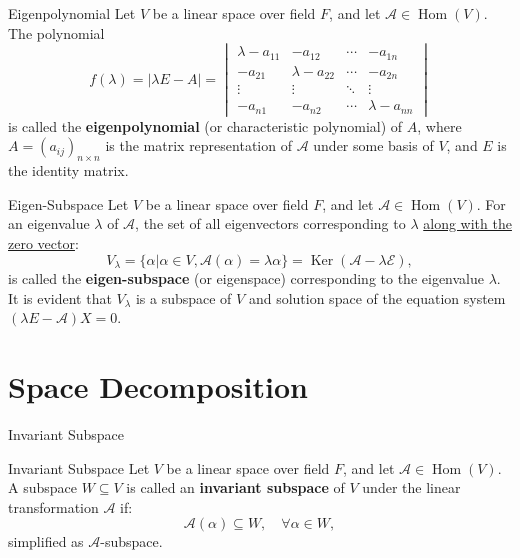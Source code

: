 \documentclass[11pt]{../../TexTemplate/elegantbook} %
\begin{document}
\begin{definition}{Eigenpolynomial}
    Let \( V \) be a linear space over field \( F \), 
    and let \( \mathcal{A}\in \operatorname{Hom}(V) \).
    The polynomial
    \[
    f(\lambda) = |\lambda E - A| = \begin{vmatrix}
        \lambda - a_{11} & -a_{12} & \cdots & -a_{1n} \\
        -a_{21} & \lambda - a_{22} & \cdots & -a_{2n} \\
        \vdots & \vdots & \ddots & \vdots \\
        -a_{n1} & -a_{n2} & \cdots & \lambda - a_{nn}
    \end{vmatrix}
    \]
    is called the \textbf{eigenpolynomial} (or characteristic polynomial) of \( A \),
    where \( A = (a_{ij})_{n\times n} \) is the matrix representation of \( \mathcal{A} \)
    under some basis of \( V \), and \( E \) is the identity matrix.
\end{definition}


\begin{definition}{Eigen-Subspace}
    Let \( V \) be a linear space over field \( F \), 
    and let \( \mathcal{A}\in \operatorname{Hom}(V) \).
    For an eigenvalue \( \lambda \) of \( \mathcal{A} \), 
    the set of all eigenvectors corresponding to \( \lambda \) \underline{along with the zero vector}:
    \[
    V_{\lambda} = \{ \alpha | \alpha \in V, \mathcal{A}(\alpha) = \lambda \alpha \} = 
    \operatorname{Ker}(\mathcal{A} - \lambda \mathcal{E}),
    \]
    is called the \textbf{eigen-subspace} (or eigenspace) corresponding to the eigenvalue \( \lambda \).
    It is evident that \( V_{\lambda} \) is a subspace of \( V \)
    and solution space of the equation system \( ( \lambda E - \mathcal{A})X = 0 \).
\end{definition}




\section{Space Decomposition}

\begin{leftbarTitle}{Invariant Subspace}\end{leftbarTitle}
\begin{definition}{Invariant Subspace}
    Let \( V \) be a linear space over field \( F \), 
    and let \( \mathcal{A}\in \operatorname{Hom}(V) \).
    A subspace \( W \subseteq V \) is called an \textbf{invariant subspace} of \( V \)
    under the linear transformation \( \mathcal{A} \) if:
    \[
    \mathcal{A}(\alpha) \subseteq W, \quad \forall \alpha \in W,
    \]
    simplified as \( \mathcal{A} \)-subspace.
\end{definition}
\end{document}
